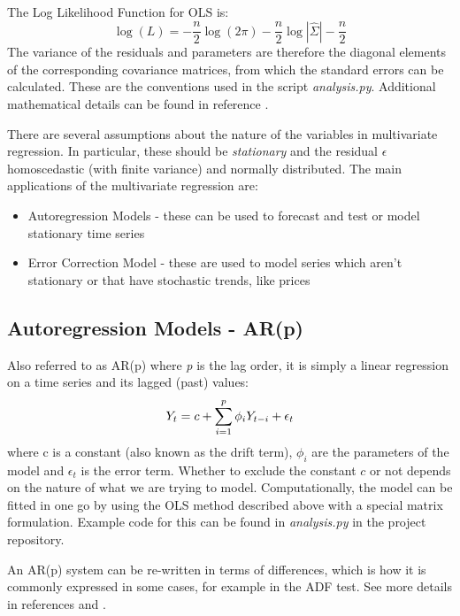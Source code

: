 \documentclass[11pt]{article}
\providecommand{\tightlist}{%
      \setlength{\itemsep}{0pt}\setlength{\parskip}{0pt}}
\begin{document}
\begin{appendices}
The Log Likelihood Function for OLS is:
\begin{equation}
\log(L) = -\frac{n}{2}\log (2 \pi) -\frac{n}{2}\log | \hat{\Sigma}| - \frac{n}{2}
\end{equation}
The variance of the residuals and parameters are therefore the diagonal
elements of the corresponding covariance matrices, from which the
standard errors can be calculated.
These are the conventions used in the script \emph{analysis.py}.
Additional mathematical details can be found in reference \cite{wikiVAR}.


There are several assumptions about the nature of the variables in multivariate regression. In particular, these should be \emph{stationary} and the residual
\(\epsilon\) homoscedastic (with finite variance) and normally
distributed.
The main applications of the multivariate regression are:

\begin{itemize}
\tightlist
\item  Autoregression Models -  these can be used to
forecast and test or model stationary time series 

\item  Error Correction Model -  these
are used to model series which aren't stationary or that have stochastic
trends, like prices
\end{itemize}


    \subsection{Autoregression Models - AR(p)}\label{autoregression-models---arp}
    
Also referred to as AR(p) where \emph{p} is the lag order, it is
simply a linear regression on a time series and its lagged (past)
values:
\begin{equation}
Y_t = c + \sum^{p}_{i=1} \phi_i Y_{t-i} + \epsilon_t \\
\end{equation}
where c is a constant (also known as the drift term), \(\phi_i\) are the
parameters of the model and \(\epsilon_t\) is the error term. Whether to
exclude the constant \(c\) or not depends on the nature of what we are
trying to model.
Computationally, the model can be fitted in one go by using the OLS
method described above with a special matrix formulation. Example code
for this can be found in \emph{analysis.py} in the project repository.

An AR(p) system can be re-written in terms of
differences, which is how it is commonly expressed
in some cases, for example in the ADF test. See more details in references \cite{wikiVAR} and \cite{wikiAR}.



\end{appendices}
\end{document}
